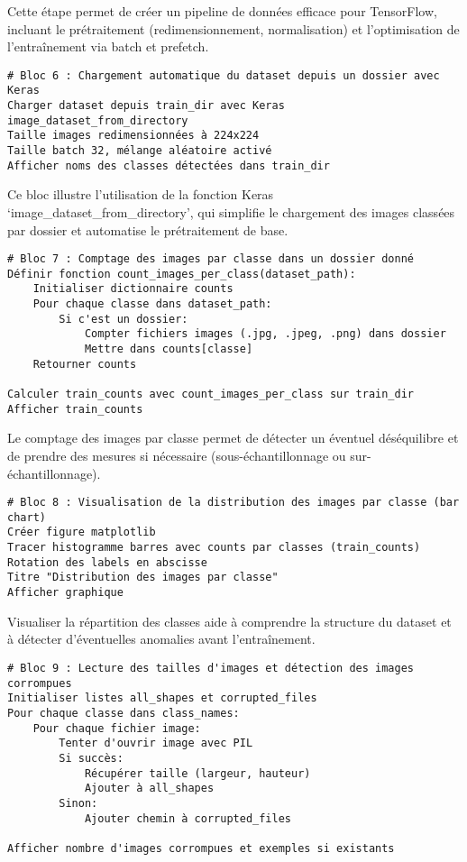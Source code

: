 Cette étape permet de créer un pipeline de données efficace pour TensorFlow, incluant le prétraitement (redimensionnement, normalisation) et l'optimisation de l'entraînement via batch et prefetch.

\begin{verbatim}
# Bloc 6 : Chargement automatique du dataset depuis un dossier avec Keras
Charger dataset depuis train_dir avec Keras image_dataset_from_directory
Taille images redimensionnées à 224x224
Taille batch 32, mélange aléatoire activé
Afficher noms des classes détectées dans train_dir
\end{verbatim}

Ce bloc illustre l'utilisation de la fonction Keras  `image\_dataset\_from\_directory', qui simplifie le chargement des images classées par dossier et automatise le prétraitement de base.

\begin{verbatim}
# Bloc 7 : Comptage des images par classe dans un dossier donné
Définir fonction count_images_per_class(dataset_path):
    Initialiser dictionnaire counts
    Pour chaque classe dans dataset_path:
        Si c'est un dossier:
            Compter fichiers images (.jpg, .jpeg, .png) dans dossier
            Mettre dans counts[classe]
    Retourner counts

Calculer train_counts avec count_images_per_class sur train_dir
Afficher train_counts
\end{verbatim}

Le comptage des images par classe permet de détecter un éventuel déséquilibre et de prendre des mesures si nécessaire (sous-échantillonnage ou sur-échantillonnage).

\begin{verbatim}
# Bloc 8 : Visualisation de la distribution des images par classe (bar chart)
Créer figure matplotlib
Tracer histogramme barres avec counts par classes (train_counts)
Rotation des labels en abscisse
Titre "Distribution des images par classe"
Afficher graphique
\end{verbatim}

Visualiser la répartition des classes aide à comprendre la structure du dataset et à détecter d’éventuelles anomalies avant l’entraînement.

\begin{verbatim}
# Bloc 9 : Lecture des tailles d'images et détection des images corrompues
Initialiser listes all_shapes et corrupted_files
Pour chaque classe dans class_names:
    Pour chaque fichier image:
        Tenter d'ouvrir image avec PIL
        Si succès:
            Récupérer taille (largeur, hauteur)
            Ajouter à all_shapes
        Sinon:
            Ajouter chemin à corrupted_files

Afficher nombre d'images corrompues et exemples si existants
\end{verbatim}

